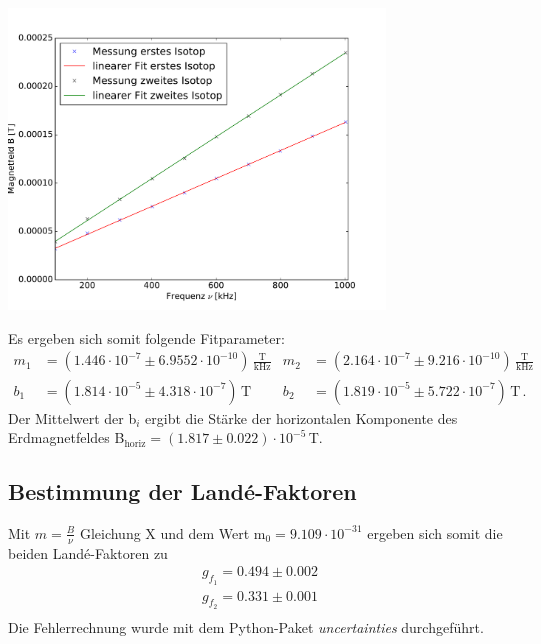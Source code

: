 \documentclass[]{scrartcl}
\begin{document}
\begin{center}
	\includegraphics[width=10cm]{images/plot1.pdf}
	\label{fig:plot1}
\end{center}
Es ergeben sich somit folgende Fitparameter:
\begin{align*}
m_1&=(1.446\cdot 10^{-7} \pm 6.9552\cdot 10^{-10})\,\frac{\text{T}}{\text{kHz}} & m_2&=(2.164\cdot 10^{-7} \pm 9.216\cdot 10^{-10})\,\frac{\text{T}}{\text{kHz}} \\
b_1&=(1.814\cdot 10^{-5} \pm 4.318\cdot 10^{-7})\,\text{T} & b_2&=(1.819\cdot 10^{-5} \pm 5.722\cdot 10^{-7})\,\text{T}\,.
\end{align*}
Der Mittelwert der b$_i$ ergibt die Stärke der horizontalen Komponente des Erdmagnetfeldes B$_{\text{horiz}}=(1.817\pm0.022)\cdot10^{-5}$\,T. \\

\subsection{Bestimmung der Landé-Faktoren}
Mit $m=\frac{B}{\nu}$ Gleichung X und dem Wert m$_0=9.109\cdot10^{-31}$ ergeben sich somit die beiden Landé-Faktoren zu
\begin{align*}
g_{f_{1}}= 0.494 \pm 0.002\\
g_{f_{2}}= 0.331 \pm 0.001 \\
\end{align*}
Die Fehlerrechnung wurde mit dem Python-Paket \textit{uncertainties} durchgeführt.
\end{document}
